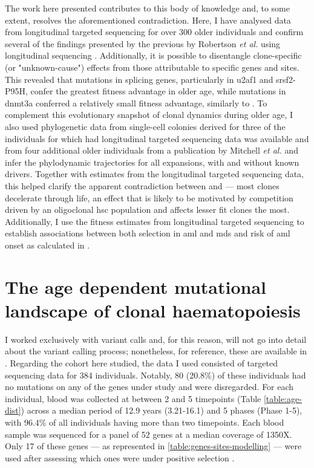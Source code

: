 The work here presented contributes to this body of knowledge and, to some extent, resolves the aforementioned contradiction. Here, I have analysed data from longitudinal targeted sequencing for over 300 older individuals and confirm several of the findings presented by the previous by Robertson \textit{et al.} using longitudinal sequencing \cite{Robertson2021-sw}. Additionally, it is possible to disentangle clone-specific (or "unknown-cause") effects from those attributable to specific genes and sites. This revealed that mutations in splicing genes, particularly in \ac{u2af1} and \ac{srsf2}-P95H, confer the greatest fitness advantage in older age, while mutations in \ac{dnmt3a} conferred a relatively small fitness advantage, similarly to \cite{Robertson2021-sw}. To complement this evolutionary snapshot of clonal dynamics during older age, I also used phylogenetic data from single-cell colonies derived for three of the individuals for which had longitudinal targeted sequencing data was available and from four additional older individuals from a publication by Mitchell \textit{et al.} \cite{Mitchell2021-zl} and infer the phylodynamic trajectories for all expansions, with and without known drivers. Together with estimates from the longitudinal targeted sequencing data, this helped clarify the apparent contradiction between \cite{Robertson2021-sw} and \cite{Watson2020-pz} --- most clones decelerate through life, an effect that is likely to be motivated by competition driven by an oligoclonal \ac{hsc} population and affects lesser fit clones the most. Additionally, I use the fitness estimates from longitudinal targeted sequencing to establish associations between both selection in \ac{aml} and \ac{mds} and risk of \ac{aml} onset as calculated in \cite{Abelson2018-wh}.

\section{The age dependent mutational landscape of clonal haematopoiesis}

I worked exclusively with variant calls and, for this reason, will not go into detail about the variant calling process; nonetheless, for reference, these are available in \cite{Fabre2021-uw}. Regarding the cohort here studied, the data I used consisted of targeted sequencing data for 384 individuals. Notably, 80 (20.8\%) of these individuals had no mutations on any of the genes under study and were disregarded. For each individual, blood was collected at between 2 and 5 timepoints (Table \ref{table:age-dist}) across a median period of 12.9 years (3.21-16.1) and 5 phases (Phase 1-5), with 96.4\% of all individuals having more than two timepoints. Each blood sample was sequenced for a panel of 52 genes at a median coverage of 1350X. Only 17 of these genes --- as represented in \ref{table:genes-sites-modelling} --- were used after assessing which ones were under positive selection \cite{Fabre2021-uw,Martincorena2017-ii}.

